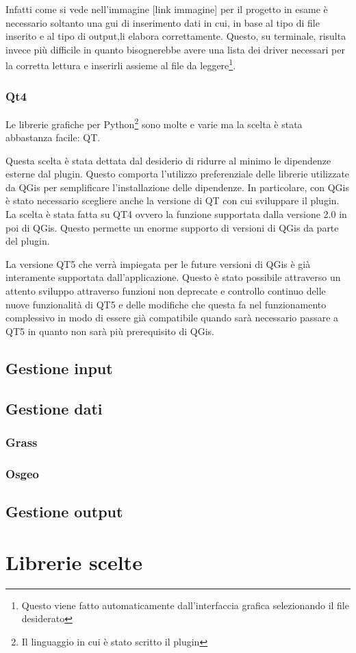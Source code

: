 
Infatti come si vede nell'immagine [link immagine] per il progetto in esame è necessario soltanto una gui di inserimento dati in cui, in base al tipo di file inserito e al tipo di output,li elabora correttamente. Questo, su terminale, risulta invece più difficile in quanto bisognerebbe avere una lista dei driver necessari per la corretta lettura e inserirli assieme al file da leggere\footnote{Questo viene fatto automaticamente dall'interfaccia grafica selezionando il file desiderato}.

\subsubsection{Qt4}

Le librerie grafiche per Python\footnote{Il linguaggio in cui è stato scritto il plugin} sono molte e varie ma la scelta è stata abbastanza facile: QT.

Questa scelta è stata dettata dal desiderio di ridurre al minimo le dipendenze esterne dal plugin. Questo comporta l'utilizzo preferenziale delle librerie utilizzate da QGis per semplificare l'installazione delle dipendenze. In particolare, con QGis è stato necessario scegliere anche la versione di QT con cui sviluppare il plugin. La scelta è stata fatta su QT4 ovvero la funzione supportata dalla versione 2.0 in poi di QGis.  Questo permette un enorme supporto di versioni di QGis da parte del plugin. 

La versione QT5 che verrà impiegata per le future versioni di QGis è già interamente supportata dall'applicazione. Questo è stato possibile attraverso un attento sviluppo attraverso funzioni non deprecate e controllo continuo delle nuove funzionalità di QT5 e delle modifiche che questa fa nel funzionamento complessivo in modo di essere già compatibile quando sarà necessario passare a QT5 in quanto non sarà più prerequisito di QGis.

\subsection{Gestione input}
\subsection{Gestione dati}
\subsubsection{Grass}
\subsubsection{Osgeo}
\subsection{Gestione output}
\section{Librerie scelte}

